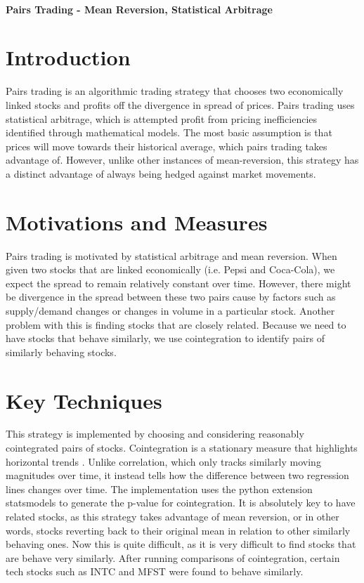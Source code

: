 \documentclass[letterpaper,11pt]{article}
\begin{document}
\thispagestyle{plain}


 \\

\noindent\textbf{Pairs Trading - Mean Reversion, Statistical Arbitrage }

\section*{Introduction }

Pairs trading is an algorithmic trading strategy that chooses two economically linked stocks and profits off the divergence in spread of prices. Pairs trading uses statistical arbitrage, which is attempted profit from pricing inefficiencies identified through mathematical models. The most basic assumption is that prices will move towards their historical average, which pairs trading takes advantage of.  However, unlike other instances of mean-reversion, this strategy has a distinct advantage of always being hedged against market movements. 

\section*{Motivations and Measures}

Pairs trading is motivated by statistical arbitrage and mean reversion\cite{Fu2009}. When given two stocks that are linked economically (i.e. Pepsi and Coca-Cola), we expect the spread to remain relatively constant over time. However, there might be divergence in the spread between these two pairs cause by factors such as supply/demand changes or changes in volume in a particular stock.  Another problem with this is finding stocks that are closely related. Because we need to have stocks that behave similarly, we use cointegration to identify pairs of similarly behaving stocks. 

\section*{Key Techniques}

This strategy is implemented by choosing and considering reasonably cointegrated pairs of stocks. Cointegration is a stationary measure that highlights horizontal trends \cite{Gatev2006}. Unlike correlation, which only tracks similarly moving magnitudes over time, it instead tells how the difference between two regression lines changes over time. The implementation uses the python extension statsmodels to generate the p-value for cointegration. It is absolutely key to have related stocks, as this strategy takes advantage of mean reversion, or in other words, stocks reverting back to their original mean in relation to other similarly behaving ones. Now this is quite difficult, as it is very difficult to find stocks that are behave very similarly. After running comparisons of cointegration, certain tech stocks such as INTC and MFST were found to behave similarly.  
\end{document}
